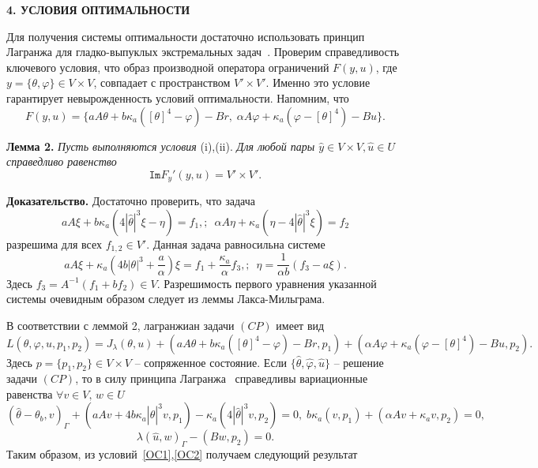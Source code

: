 \documentclass[12pt]{article}
\begin{document}
    \begin{center}
        \textbf{4. УСЛОВИЯ ОПТИМАЛЬНОСТИ}
    \end{center}

    Для получения системы оптимальности достаточно использовать
    принцип Лагранжа для гладко-выпуклых экстремальных задач~\cite{10,11}.
    Проверим справедливость ключевого условия, что образ производной
    оператора ограничений $F(y, u)$, где $y=\{\theta,\varphi\}\in V\times V$,
    совпадает с пространством $V'\times V'.$ Именно это условие гарантирует
    невырожденность условий оптимальности.
    Напомним, что
    $$
    F(y, u) = \{ aA\theta + b \kappa_a ( [\theta]^4- \varphi) - Br,\;
    \alpha A \varphi + \kappa_a (\varphi -[\theta]^4) - Bu\}.$$


    \textbf{Лемма 2.}
    {\it
    Пусть выполняются условия} (i),(ii).
        {\it Для любой пары $\hat{y} \in V \times V, \hat{u} \in U$ справедливо равенство}
    \[
        \texttt{Im}F_y'(y, u) = V' \times V'.
    \]


        {\bf Доказательство.} Достаточно проверить, что задача
    $$
    aA \xi + b \kappa_a (4|\hat{\theta}|^3 \xi - \eta) = f_1, ;\ \;
    \alpha A \eta + \kappa_a (\eta - 4|\hat{\theta}|^3 \xi) = f_2
    $$
    разрешима для всех $f_{1,2}\in V'.$ Данная задача равносильна системе
    $$
    aA\xi + \kappa_a\left(4b|\theta|^3 + \frac{a}{\alpha}\right) \xi = f_1
    +\frac{\kappa_a}{\alpha}f_3, ;\ \;
    \eta =\frac{1}{\alpha b}( f_3-a\xi).
    $$
    Здесь $f_3=A^{-1}(f_1+bf_2)\in V.$ Разрешимость первого уравнения указанной системы очевидным образом следует из
    леммы Лакса-Мильграма.


    В соответствии с леммой 2, лагранжиан задачи $(CP)$ имеет вид
    $$
    L(\theta, \varphi, u, p_1, p_2) = J_\lambda(\theta, u)
    + (aA\theta + b\kappa_a([\theta]^4 - \varphi) - Br, p_1)
    + (\alpha A \varphi + \kappa_a(\varphi - [\theta]^4) - Bu, p_2).
    $$
    Здесь $p=\{p_1,p_2\}\in V\times V$ -- сопряженное состояние.
    Если $\{\hat{\theta}, \hat{\varphi}, \hat{u} \}$ -- решение задачи $(CP)$, то
    в силу принципа Лагранжа~\cite[Теорема 1.5]{10} справедливы вариационные равенства
    $\forall v\in V,\, w\in U$
    \begin{equation}
        \label{OC1}
        (\hat{\theta} -\theta_b, v)_\Gamma + (aAv + 4 b\kappa_a |\hat{\theta}|^3v, p_1)
        - \kappa_a ( 4 |\hat{\theta}|^3v, p_2) = 0,\;
        b \kappa_a (v, p_1)+ (\alpha A v + \kappa_a v, p_2) = 0,
    \end{equation}
    \begin{equation}
        \label{OC2}
        \lambda(\hat{u},w)_\Gamma - (Bw, p_2) = 0.
    \end{equation}
    Таким образом, из условий~\eqref{OC1},\eqref{OC2}
    получаем следующий результат
\end{document}
